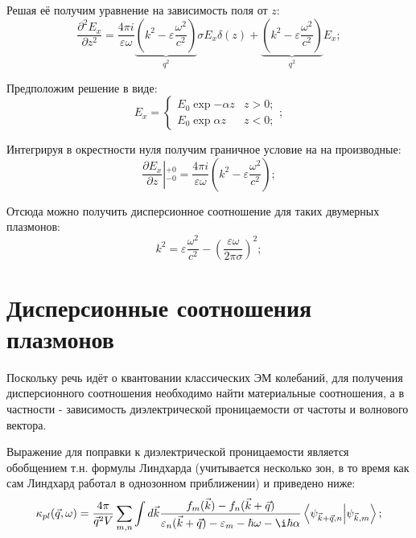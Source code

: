 \documentclass[../main.tex]{subfiles}
\begin{document}
    Решая её получим уравнение на зависимость поля от $z$:
    \begin{equation}
        \frac{\partial^2 E_x}{\partial z^2} = \frac{4\pi i}{\varepsilon \omega}
        \underbrace{\left(k^2  - \varepsilon \frac{\omega^2}{c^2}\right)}_{q^2} \sigma E_x \delta(z)
        + \underbrace{\left(k^2  - \varepsilon \frac{\omega^2}{c^2}\right)}_{q^2} E_x;
    \end{equation}

    Предположим решение в виде:
    \begin{equation*}
        E_x = \left\{
            \begin{aligned}
                E_0 \exp{-\alpha z} & z > 0;\\
                E_0 \exp{\alpha z} & z < 0;
            \end{aligned}
        \right.;
    \end{equation*}

    Интегрируя в окрестности нуля получим граничное условие на на производные:
    \begin{equation*}
        \left.\frac{\partial E_x}{\partial z}\right\vert{}^{+0}_{-0} = \frac{4\pi i}{\varepsilon \omega}
        \left(k^2  - \varepsilon \frac{\omega^2}{c^2}\right);
    \end{equation*}

    Отсюда можно получить дисперсионное соотношение для таких двумерных плазмонов:
    \begin{equation}
        \label{plasmons:disp}
        k^2  = \varepsilon  \frac{\omega^2}{c^2} - \left(\frac{\varepsilon\omega}{2\pi \sigma}\right)^2;
    \end{equation}
    
    \section{Дисперсионные соотношения плазмонов}

    Поскольку речь идёт о квантовании классических ЭМ колебаний, 
    для получения дисперсионного соотношения необходимо найти 
    материальные соотношения, а в частности - зависимость 
    диэлектрической проницаемости от частоты и волнового вектора.

    Выражение для поправки к диэлектрической проницаемости является 
    обобщением т.н. формулы Линдхарда (учитывается несколько зон, в то 
    время как сам Линдхард работал в однозонном приближении)
    и приведено ниже:
    \begin{equation}
        \label{lindhard}
        \kappa_{pl}(\vec q, \omega) = \frac{4\pi}{\vec{q}^2 V}
            \sum_{m, n} \int d\vec k \frac{f_m(\vec k) - f_n(\vec k 
                + \vec q)}{\varepsilon_n(\vec k + \vec q) - 
                \varepsilon_m - \hbar \omega - \i \hbar \alpha}
                \bra{\psi_{\vec k + \vec q,n}} \ket{\psi_{\vec k, m}};
    \end{equation}
\end{document}
